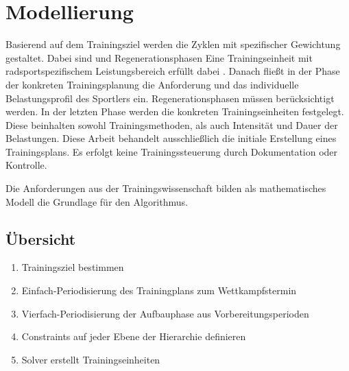 \chapter{Modellierung}
\label{sec:modellierung}
Basierend auf dem Trainingsziel werden die Zyklen mit spezifischer Gewichtung gestaltet. Dabei sind  und Regenerationsphasen Eine Trainingseinheit mit radsportspezifischem Leistungsbereich erfüllt dabei .
Danach fließt in der Phase der konkreten Trainingsplanung die Anforderung und das individuelle Belastungsprofil des Sportlers ein. Regenerationsphasen müssen berücksichtigt werden. 
In der letzten Phase werden die konkreten Trainingseinheiten festgelegt. Diese beinhalten sowohl Trainingsmethoden, als auch Intensität und Dauer der Belastungen. 
Diese Arbeit behandelt ausschließlich die initiale Erstellung eines Trainingsplans. Es erfolgt keine Trainingssteuerung durch Dokumentation oder Kontrolle.

    
Die Anforderungen aus der Trainingswissenschaft bilden als mathematisches Modell die Grundlage für den Algorithmus. 



\section{Übersicht}
\label{sec:modellierung:uebersicht}
    \begin{enumerate}
        \item Trainingsziel bestimmen
        \item Einfach-Periodisierung des Trainingplans zum Wettkampfstermin
        \item Vierfach-Periodisierung der Aufbauphase aus Vorbereitungsperioden
        \item Constraints auf jeder Ebene der Hierarchie definieren 
        \item Solver erstellt Trainingseinheiten
    \end{enumerate}
